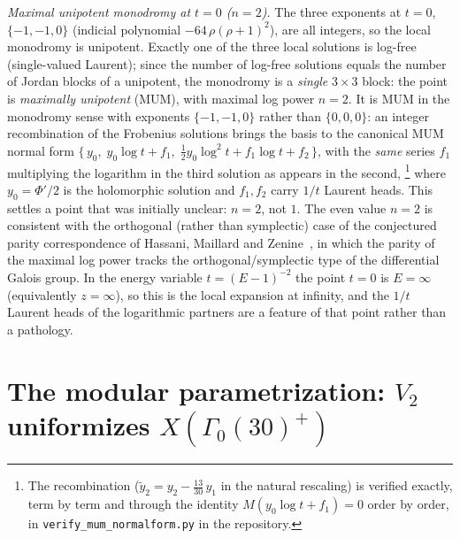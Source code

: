 \documentclass[11pt]{article}
\theoremstyle{plain}
\theoremstyle{remark}
\begin{document}
\emph{Maximal unipotent monodromy at $t=0$ ($n=2$).} The three exponents at $t=0$, $\{-1,-1,0\}$ (indicial
polynomial $-64\,\rho(\rho+1)^2$), are all integers, so the local monodromy is unipotent. Exactly one of the three
local solutions is log-free (single-valued Laurent); since the number of log-free solutions equals the number of
Jordan blocks of a unipotent, the monodromy is a \emph{single} $3\times3$ block: the point is \emph{maximally
unipotent} (MUM), with maximal log power $n=2$. It is MUM in the monodromy sense with exponents $\{-1,-1,0\}$
rather than $\{0,0,0\}$: an integer recombination of the Frobenius solutions brings the basis to the canonical MUM
normal form $\{\,y_0,\;y_0\log t+f_1,\;\tfrac12 y_0\log^2t+f_1\log t+f_2\,\}$, with the \emph{same} series $f_1$
multiplying the logarithm in the third solution as appears in the second,%
\footnote{The recombination ($\tilde y_2=y_2-\tfrac{13}{30}\,y_1$ in the natural rescaling) is verified exactly, term by term and through the identity
$M(y_0\log t+f_1)=0$ order by order, in \texttt{verify\_mum\_normalform.py} in the repository.}
where $y_0=\Phi'/2$ is the holomorphic solution and $f_1,f_2$ carry $1/t$ Laurent heads. This settles a point that
was initially unclear: $n=2$, not $1$. The even value $n=2$ is consistent with the orthogonal (rather than
symplectic) case of the conjectured parity correspondence of Hassani, Maillard and Zenine~\cite{HMZ2025}, in which the parity
of the maximal log power tracks the orthogonal/symplectic type of the differential Galois group. In the energy
variable $t=(E-1)^{-2}$ the point $t=0$ is $E=\infty$ (equivalently $z=\infty$), so this is the local expansion at
infinity, and the $1/t$ Laurent heads of the logarithmic partners are a feature of that point rather than a
pathology.

\section{The modular parametrization: \texorpdfstring{$V_2$ uniformizes $X(\Gamma_0(30)^+)$}{V2 uniformizes X(Gamma0(30)+)}}
\label{sec:modular}
\end{document}

